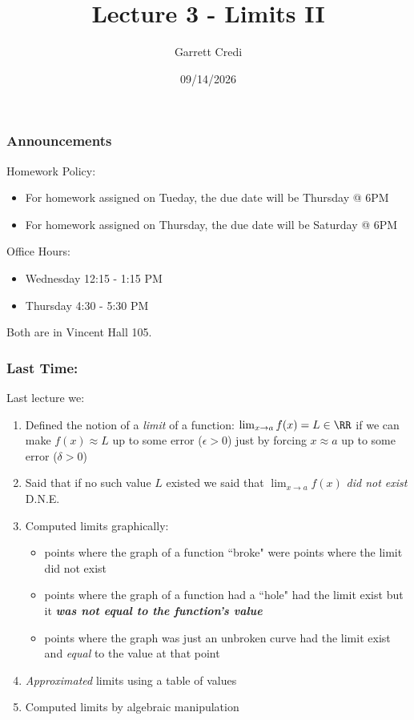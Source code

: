 \documentclass{ltx-talk}
\title{Lecture 3 - Limits II}
\author{Garrett Credi}
\date{09/14/2026}
\begin{document}
\begin{frame}
  \maketitle
\end{frame}

\begin{frame}
  \frametitle{Announcements}

  Homework Policy: \pause

  \begin{itemize}
    \item For homework assigned on Tueday, the due date will be Thursday @ 6PM  \pause
    \item For homework assigned on Thursday, the due date will be Saturday @ 6PM
  \end{itemize} \pause

  Office Hours: \pause
  \begin{itemize}
    \item Wednesday 12:15 - 1:15 PM
    \item Thursday 4:30 - 5:30 PM \pause
  \end{itemize}

  Both are in Vincent Hall 105.
\end{frame}

\begin{frame}
  \frametitle{Last Time:}

  Last lecture we: \pause
  \begin{enumerate}
    \item Defined the notion of a \textit{limit} of a function: \pause $\lim_{x \rightarrow a} f(x) = L \in \RR$
      if we can make $f(x) \approx L$ up to some error ($\epsilon > 0$) just by forcing $x \approx a$ up to some error ($\delta > 0$) \pause
    \item Said that if no such value $L$ existed we said that $\lim_{x \rightarrow a} f(x)$ \textit{did not exist} D.N.E. \pause
    \item Computed limits graphically: \pause 
      \begin{itemize}
        \item points where the graph of a function ``broke" were points where the limit did not exist  \pause
        \item points where the graph of a function had a ``hole" had the limit exist but it \textit{\textbf{was not equal to the function's value}} \pause
        \item points where the graph was just an unbroken curve had the limit exist and \textit{equal} to the value at that point \pause
      \end{itemize}
    \item \textit{Approximated} limits using a table of values \pause
    \item Computed limits by algebraic manipulation
  \end{enumerate}
\end{frame}
\end{document}
